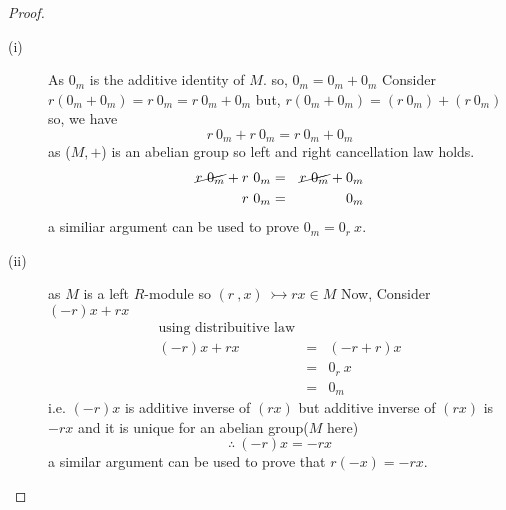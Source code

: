 \begin{proof}
	\begin{description}
		\item[(i)]
As $0_m$ is the additive identity of $M$. so, $0_m = 0_m + 0_m$\newline
Consider 
 $ r(0_m + 0_m) = r\ 0_m  = r\ 0_m +0_m $\newline
but, $r(0_m + 0_m) = (r\ 0_m) +(r\ 0_m)$ \newline
so, we have \begin{equation*}
r\ 0_m +r\ 0_m = r\ 0_m + 0_m
\end{equation*}
as ($M,+$) is an abelian group so left and right cancellation law holds.
\begin{eqnarray*}
\cancel{r\ 0_m} +r\ 0_m &=& \cancel{r\ 0_m} + 0_m \\ r\ 0_m &=& 0_m
\end{eqnarray*}
a similiar argument can be used to prove $0_m = 0_r\ x$.
\item[(ii)]
as $M$ is a left $R$-module so $(r \ , x )\ \rightarrowtail rx \in M$ \newline
Now, Consider $(-r)x + rx$
\begin{eqnarray*}
\text{using distribuitive law} \\ (-r)x + rx &=& (-r + r)x \\  &=& 0_r \ x \\ &=& 0_m
\end{eqnarray*}
i.e. $(-r)x$ is additive inverse of  $(rx)$ but additive inverse of $(rx)$ is $-rx$ and it is unique for an abelian group($M$ here)
\begin{equation*}
\therefore \ (-r)x = -rx
\end{equation*}
a similar argument can be used to prove that $r(-x)  = -r x$.
\end{description}
\end{proof}
\bigskip
